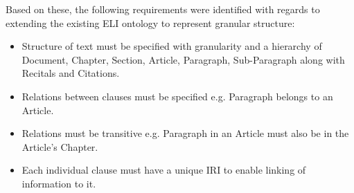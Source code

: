 Based on these, the following requirements were identified with regards to extending the existing ELI ontology to represent granular structure:
\begin{itemize}
    \item Structure of text must be specified with granularity and a hierarchy of Document, Chapter, Section, Article, Paragraph, Sub-Paragraph along with Recitals and Citations.
    \item Relations between clauses must be specified e.g. Paragraph belongs to an Article.
    \item Relations must be transitive e.g. Paragraph in an Article must also be in the Article's Chapter.
    \item Each individual clause must have a unique IRI to enable linking of information to it.
\end{itemize}

